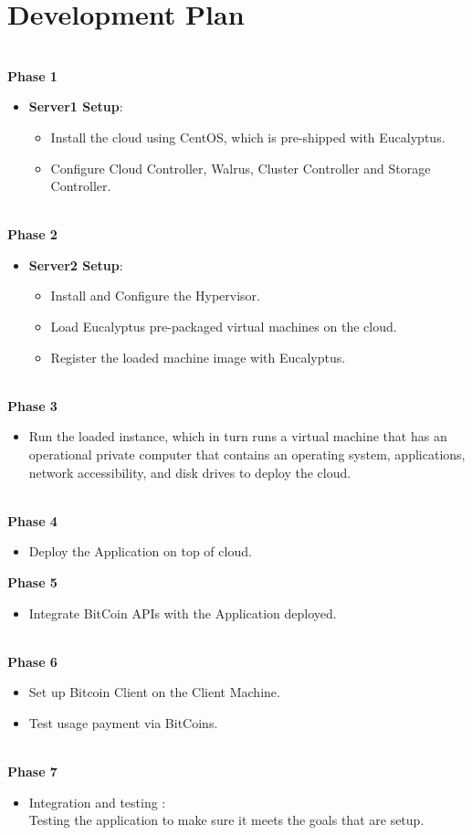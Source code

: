 \documentclass[a4page,12pt]{article}
\begin{document}
\section{Development Plan}
\textbf{\\Phase 1}
\begin{itemize}
\item \textbf{Server1 Setup}:
\begin{itemize}
\item Install the cloud using CentOS, which is pre-shipped with Eucalyptus.
\item Configure Cloud Controller, Walrus, Cluster Controller and Storage Controller.
\end{itemize}
\end{itemize}
\textbf{\\Phase 2}
\begin{itemize}
\item \textbf{Server2 Setup}:
\begin{itemize}
\item Install and Configure the Hypervisor.
\item Load Eucalyptus pre-packaged virtual machines on the cloud.
\item Register the loaded machine image with Eucalyptus.
\end{itemize}
\end{itemize}
\textbf{\\Phase 3}
\begin{itemize}
\item Run the loaded instance, which in turn runs a virtual machine that has an operational private computer that contains an operating system, applications, network accessibility, and disk drives to deploy the cloud.
\end{itemize}
\textbf{\\Phase 4}
\begin{itemize}
\item Deploy the Application on top of cloud.\\
\end{itemize}
\textbf{Phase 5}
\begin{itemize}
\item Integrate BitCoin APIs with the Application deployed.
\end{itemize}
\textbf{\\Phase 6}
\begin{itemize}
\item Set up Bitcoin Client on the Client Machine.
\item Test usage payment via BitCoins.
\end{itemize}
\textbf{\\Phase 7}
\begin{itemize}
\item Integration and testing :\\
Testing the application to make sure it meets the goals that are setup.
\end{itemize}
\pagebreak
\end{document}
